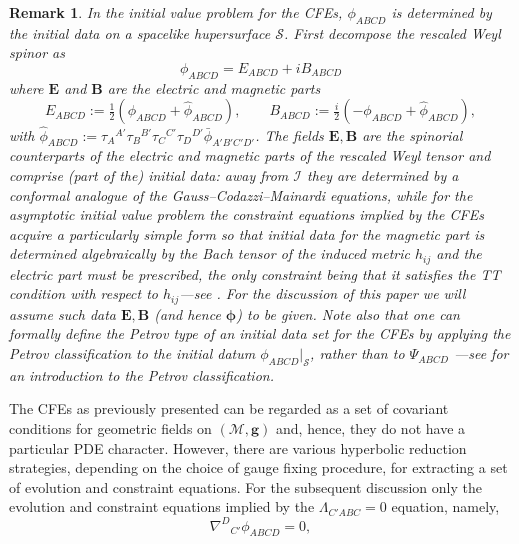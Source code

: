 \documentclass[10pt,a4paper]{article}
\theoremstyle{plain}
\newtheorem{remark}{Remark}
\def\bmg{{\bm g}}
\def\bmB{{\bm B}}
\def\bmE{{\bm E}}
\begin{document}
 \begin{remark}
 \label{G-C-M-Remark}
   \emph{In the initial value problem for the CFEs, $\phi_{ABCD}$ is
   determined by the initial data on a spacelike hupersurface
   $\mathcal{S}$. First decompose the rescaled Weyl spinor as
   \[ \phi_{ABCD}=E_{ABCD}+iB_{ABCD}\]
where $\bmE$ and $\bmB$ are the \textit{electric} and
\textit{magnetic} parts
   \[
   E_{ABCD} := \tfrac{1}{2}(\phi_{ABCD} + \hat{\phi}_{ABCD}),\qquad
   B_{ABCD} := \tfrac{i}{2}(-\phi_{ABCD} + \hat{\phi}_{ABCD}),
  \]
  with
  $\hat{\phi}_{ABCD}:=\tau_A{}^{A'}\tau_B{}^{B'}\tau_C{}^{C'}\tau_D{}^{D'}\bar{\phi}_{A'B'C'D'}$. The
  fields $\bmE,\bmB$ are the spinorial counterparts of the electric
  and magnetic parts of the rescaled Weyl tensor and comprise (part of
  the) initial data: away from $\mathscr{I}$ they are determined by
  a conformal analogue of the Gauss--Codazzi--Mainardi equations, while for the asymptotic
  initial value problem the constraint equations implied by the CFEs
  acquire a particularly simple form so that initial data for the
  magnetic part is determined algebraically by the Bach tensor of the
  induced metric $h_{ij}$ and the electric part must be prescribed,
  the only constraint being that it satisfies the
  \textit{TT} condition with respect to $h_{ij}$---see \cite{CFEbook,
    GasVal17a}.  For the discussion of this paper we will assume such
  data $\bmE, \bmB$ (and hence $\bm\phi$) to be given. Note also that one can
  formally define the Petrov type of an initial data set for the CFEs
  by applying the Petrov classification to the initial datum
  $\phi_{ABCD}|_{\mathcal{S}}$, rather than to $\Psi_{ABCD}$ ---see
  \cite{Ste91} for an introduction to the Petrov classification.  }
\end{remark}
The CFEs as previously presented can be regarded as a set of covariant
conditions for geometric fields on $(\mathcal{M},\bmg)$ and, hence,
they do not have a particular PDE character. However, there are
various hyperbolic reduction strategies, depending on the choice of
gauge fixing procedure, for extracting a set of evolution and
constraint equations.  For the subsequent discussion only the
evolution and constraint equations implied by the $\Lambda_{C'ABC}=0$
equation, namely,
\begin{equation}\label{RescaledWeylEquationDisplayed}
 \nabla^D{}_{C'}\phi _{ABCD}=0,
\end{equation}
\end{document}
